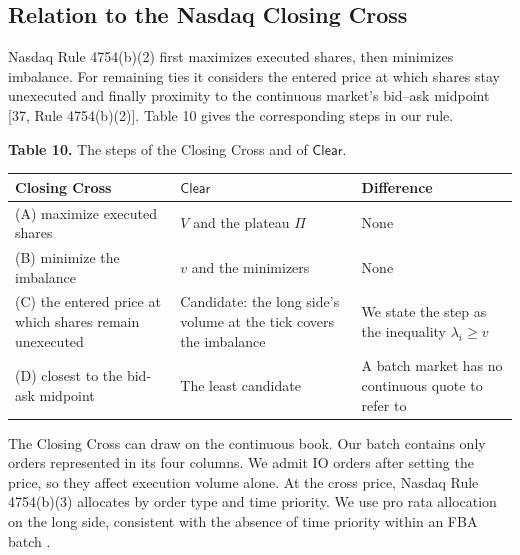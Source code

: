 \subsection{Relation to the Nasdaq Closing Cross}

Nasdaq Rule 4754(b)(2) first maximizes executed shares, then minimizes imbalance. For remaining ties it considers the entered price at which shares stay unexecuted and finally proximity to the continuous market's bid--ask midpoint [37, Rule 4754(b)(2)]. Table 10 gives the corresponding steps in our rule.

\textbf{Table 10.} The steps of the Closing Cross and of \(\mathsf{Clear}\).

\begin{longtable}{@{}
  >{\raggedright\arraybackslash}p{}
  >{\raggedright\arraybackslash}p{}
  >{\raggedright\arraybackslash}p{}
@{}}
\toprule
Closing Cross & \(\mathsf{Clear}\) & Difference \\
\midrule
\endhead
\bottomrule
\endlastfoot

(A) maximize executed shares
  & \(V\) and the plateau \(\Pi\)
  & None \\

(B) minimize the imbalance
  & \(v\) and the minimizers
  & None \\

(C) the entered price at which shares remain unexecuted
  & Candidate: the long side's volume at the tick covers the imbalance
  & We state the step as the inequality \(\lambda_i \ge v\) \\

(D) closest to the bid-ask midpoint
  & The least candidate
  & A batch market has no continuous quote to refer to \\
\end{longtable}

The Closing Cross can draw on the continuous book. Our batch contains only orders represented in its four columns. We admit IO orders after setting the price, so they affect execution volume alone. At the cross price, Nasdaq Rule 4754(b)(3) allocates by order type and time priority. We use pro rata allocation on the long side, consistent with the absence of time priority within an FBA batch \cite{budish2015}.


